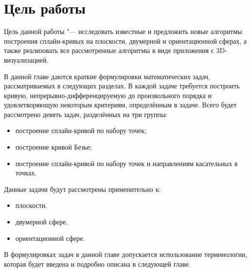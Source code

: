 \section{Цель работы}

Цель данной работы "--- исследовать известные и предложить новые алгоритмы построения сплайн-кривых на плоскости,
двумерной и ориентационной сферах, а также реализовать все рассмотренные алгоритмы в виде приложения с 3D-визуализацией.

В данной главе даются краткие формулировки математических задач, рассматриваемых в следующих разделах. В каждой
задаче требуется построить кривую, непрерывно-дифференцируемую до произвольного порядка и удовлетворяющую некоторым
критериям, определённым в задаче. Всего будет рассмотрено девять задач, разделённых на три группы:

\begin{itemize}

\item построение сплайн-кривой по набору точек;
\item построение кривой Безье;
\item построение сплайн-кривой по набору точек и направлениям касательных в точках.

\end{itemize}

Данные задачи будут рассмотрены применительно к:

\begin{itemize}

\item плоскости,
\item двумерной сфере,
\item ориентационной сфере.

\end{itemize}

В формулировках задач в данной главе допускается использование терминологии, которая будет введена и подробно описана
в следующей главе.
